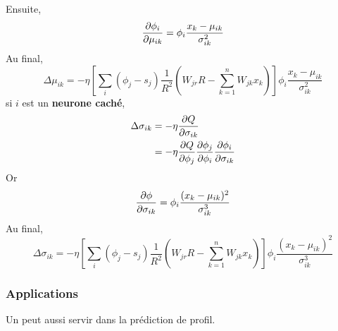 Ensuite,
\[\frac{\partial \phi_i}{\partial \mu_{ik}} = \phi_i \frac{x_k-\mu_{ik}}{\sigma_{ik}^2}\]
Au final,
\[\Delta\mu_{ik} = -\eta \left[\sum_{i}(\phi_j - s_j) \frac{1}{R^2} \left(W_{jr}R - \sum_{k=1}^{n}W_{jk}x_k\right)\right] \phi_i\frac{x_k-\mu_{ik}}{\sigma_{ik}^2}\]
si $i$ est un \textbf{neurone caché},
\begin{equation}
 \begin{split}
 \Delta \sigma_{ik} & = -\eta \frac{\partial Q}{\partial \sigma_{ik}}\\
 ~ & = -\eta \frac{\partial Q}{\partial \phi_j} \frac{\partial \phi_j}{\partial \phi_i} \frac{\partial \phi_i}{\partial \sigma_{ik}}
 \end{split}
\end{equation}
Or \[\frac{\partial \phi}{\partial \sigma_{ik}} = \phi_i \frac{(x_k-\mu_{ik})^2}{\sigma_{ik}^3}\]
Au final,
\[\Delta \sigma_{ik} = -\eta \left[\sum_{i}(\phi_j - s_j) \frac{1}{R^2} \left(W_{jr}R - \sum_{k=1}^{n}W_{jk}x_k\right)\right] \phi_i \frac{(x_k-\mu_{ik})^2}{\sigma_{ik}^3}\]
\subsubsection{Applications}
Un \rbf peut aussi servir dans la prédiction de profil.\cite{statistica}